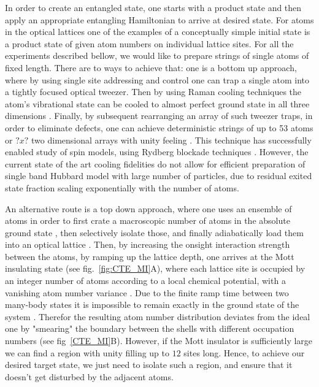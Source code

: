 In order to create an entangled state, one starts with a product state and then apply an appropriate entangling Hamiltonian to arrive at desired state.  For atoms in the optical lattices one of the examples of a conceptually simple initial state is a product state of given atom numbers on individual lattice sites. For all the experiments described bellow, we would like to prepare strings of single atoms of fixed length. There are to ways to achieve that: one is a bottom up approach, where by using single site addressing and control one can trap a single atom into a tightly focused optical tweezer. Then by using Raman cooling techniques the atom's vibrational state can be cooled to almost perfect ground state in all three dimensions \cite{adamo, selim}. Finally, by subsequent rearranging an array of such tweezer traps, in order to eliminate defects, one can achieve deterministic strings of up to 53 atoms \cite{misha} or $?x?$ two dimensional arrays with unity feeling \cite{broweys}. This technique has successfully enabled study of spin models, using Rydberg blockade techniques \cite{misha}. However, the current state of the art cooling fidelities do not allow for efficient preparation of single band Hubbard model with large number of particles, due to residual exited state fraction scaling exponentially with the number of atoms.

An alternative route is a top down approach, where one uses an ensemble of atoms in order to first crate a macroscopic number of atoms in the absolute ground state \cite{BEC, DFG}, then selectively isolate those, and finally adiabatically load them into an optical lattice \cite{Greiner2002}. Then, by increasing the onsight interaction strength between the atoms, by ramping up the lattice depth, one arrives at the Mott insulating state (see fig.~\ref{fig:CTE_MI}A), where each lattice site is occupied by an integer number of atoms according to a local chemical potential, with a vanishing atom number variance \cite{Bakr2010, Bloch MI}. Due to the finite ramp time between two many-body states it is impossible to remain exactly in the ground state of the system \cite{subir phase transition}. Therefor the resulting atom number distribution deviates from the ideal one by "smearing" the boundary between the shells with different occupation numbers (see fig~\ref{CTE_MI}B). However, if the Mott insulator is sufficiently large we can find a region with unity filling up to $12$ sites long. Hence, to achieve our desired target state, we just need to isolate such a region, and ensure that it doesn't get disturbed by the adjacent atoms.

